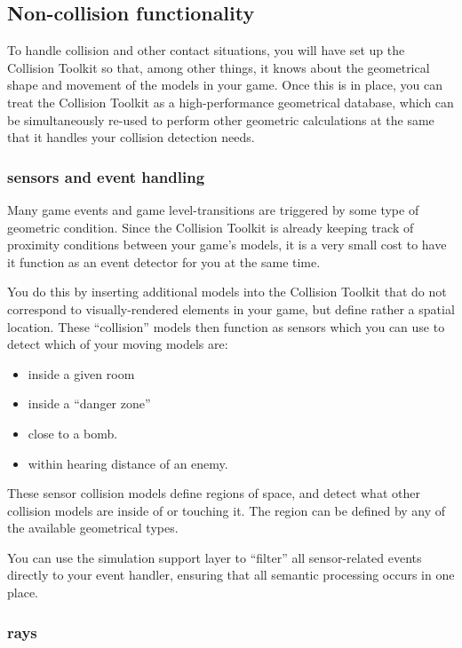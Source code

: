 \documentclass[11pt]{article}
\begin{document}
\subsection{ Non-collision functionality }

To handle collision and other contact situations, you will
have set up the Collision Toolkit so that, among other things, it knows about the geometrical shape and movement of the models in your game. Once this is in place, you can
treat the Collision Toolkit as a high-performance geometrical database, which can be
simultaneously re-used to perform other geometric calculations at the same
that it handles your collision detection needs.

\subsubsection{ sensors and event handling }

Many game events and game level-transitions are triggered by some type of
geometric condition. Since the Collision Toolkit is already keeping track of proximity
conditions between your game's models, it is a very small cost to have it
function as an event detector for you at the same time.

You do this by
inserting additional models into the Collision Toolkit that do not correspond to
visually-rendered elements in your game, but define rather a spatial
location.
These ``collision'' models then function as sensors which you can use to
detect which of your moving models are:

\begin{itemize}
\item inside a given room
\item inside a ``danger zone''
\item close to a bomb.
\item within hearing distance of an enemy.
\end{itemize}

These sensor collision models define regions of space, and detect what
other collision models are inside of or touching it. The region can be defined by any of the available geometrical types.

You can use the simulation support layer 
to ``filter'' all sensor-related
events directly to your event handler,
ensuring that all semantic
processing occurs in one place.

\subsubsection{ rays }
\end{document}

